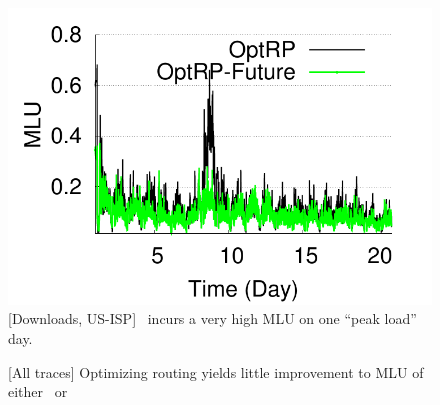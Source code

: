 \begin{figure}[t]
\begin{center}
	\includegraphics[scale=0.45]{graphSet1/software/mlu_Xiaozheng.pdf}
\end{center}
\vspace{-0.30in}
\caption{[Downloads, US-ISP] \optrp\ incurs a very high MLU on one ``peak load'' day.}
\label{fig:softwarepeak}
\end{figure}



\begin{figure}[t]	
\begin{center}
\end{center}
\vspace{-0.25in}
\caption{[All traces] Optimizing routing yields little  improvement to MLU of either \invlru\ or \invoptpfuture}\vspace{-0.2in}
\label{fig:mlureduction}
\end{figure}

